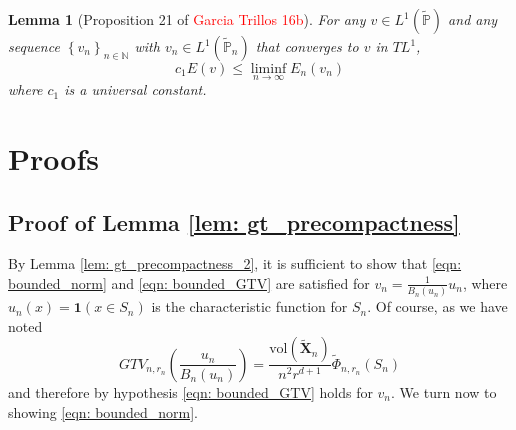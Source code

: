 \documentclass{article}
\newcommand{\set}[1]{\left\{#1\right\}}
\newcommand{\seq}[1]{\set{#1}_{n \in \N}}
\newcommand{\N}{\mathbb{N}}
\newcommand{\Xbf}{\mathbf{X}}
\newcommand{\Pbb}{\mathbb{P}}
\newcommand{\1}{\mathbf{1}}
\newcommand{\vol}{\mathrm{vol}}
\theoremstyle{alden}
\theoremstyle{aldenthm}
\newtheorem{lemma}{Lemma}
\theoremstyle{remark}
\begin{document}
\begin{lemma}[Proposition 21 of \textcolor{red}{Garcia Trillos 16b}]
	\label{lem: liminf_E}
	For any $v \in L^1(\widetilde{\Pbb})$ and any sequence $\seq{v_n}$ with $v_n \in L^1(\widetilde{\Pbb}_n)$ that converges to $v$ in $TL^1$,
	\begin{equation*}
	c_1 E(v)  \leq \liminf_{n \to \infty} E_n(v_n)
	\end{equation*}
	where $c_1$ is a universal constant. 
\end{lemma}
\section{Proofs}

\subsection{Proof of Lemma \ref{lem: gt_precompactness}}

By Lemma \ref{lem: gt_precompactness_2}, it is sufficient to show that \eqref{eqn: bounded_norm} and \eqref{eqn: bounded_GTV} are satisfied for $v_n = \frac{1}{B_n(u_n)}u_n$, where $u_n(x) = \1(x \in S_n)$ is the characteristic function for $S_n$. Of course, as we have noted
\begin{equation*}
GTV_{n,r_n}\left(\frac{u_n}{B_n(u_n)}\right) = \frac{\vol(\widetilde{\Xbf}_n)}{n^2 r^{d+1}}\widetilde{\Phi}_{n,r_n}(S_n)
\end{equation*}
and therefore by hypothesis \eqref{eqn: bounded_GTV} holds for $v_n$. We turn now to showing \eqref{eqn: bounded_norm}. 
\end{document}
